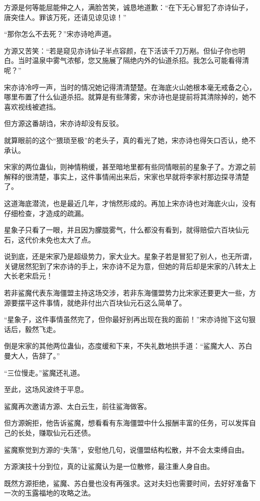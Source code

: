 \begin{this_body}
方源是何等能屈能伸之人，满脸苦笑，诚恳地道歉：“在下无心冒犯了亦诗仙子，唐突佳人。罪该万死，还请见谅见谅！”

“那你怎么不去死？”宋亦诗呛声道。

方源又苦笑：“若是窥见亦诗仙子半点容颜，在下活该千刀万剐。但仙子你也明白。当时温泉中雾气浓郁，您又施展了隔绝内外的仙道杀招。我怎么可能看得清呢？”

宋亦诗冷哼一声，当时的情况她记得清清楚楚。在海底火山她根本毫无戒备之心，哪里布置了什么仙道杀招。就算是有些薄雾，宋亦诗也是提前将其清除掉的，她不喜欢视线被遮挡。

但方源这番胡诌，宋亦诗却没有反驳。

就算眼前的这个“猥琐至极”的老头子，真的看光了她，宋亦诗也得矢口否认，绝不承认。

宋家的两位蛊仙，则神情稍缓，甚至暗地里都有些同情眼前的星象子了。方源之前解释的很清楚，事实上，这件事情闹出来后，宋家也早就将李家村那边探寻清楚了。

这道海底潜流，也是最近几年，才悄然形成的。再加上宋亦诗也对海底火山，没有仔细检查，才造成的疏漏。

星象子只看了一眼，并且因为朦胧雾气，什么都没有看到，就得赔偿六百块仙元石，这代价未免也太大了点。

说到底，还是宋家乃是超级势力，家大业大。星象子若是冒犯了别人，也无所谓，关键居然犯到了宋亦诗的手上，宋亦诗不足为意，但她的背后却是宋家的八转太上大长老宋启元！

若非鲨魔代表东海僵盟主持这场交涉，若非东海僵盟势力比宋家还要更大一些，方源要摆平这件事情，就绝非付出六百块仙元石这么简单了。

“星象子，这件事情虽然完了，但你最好别再出现在我的面前！”宋亦诗抛下这句狠话后，毅然飞走。

倒是宋家的其他两位蛊仙，态度缓和下来，不失礼数地拱手道：“鲨魔大人、苏白曼大人，告辞了。”

“三位慢走。”鲨魔还礼道。

至此，这场风波终于平息。

鲨魔再次邀请方源、太白云生，前往鲨海做客。

但方源婉拒，他告诉鲨魔，想看看有东海僵盟中什么报酬丰富的任务，可以发挥自己的长处，赚取仙元石还债。

鲨魔察觉到方源的“失落”，安慰他几句，说僵盟结构松散，并不会太束缚自由。

方源演技十分到位，真的让鲨魔认为是一位散修，最注重人身自由。

既然方源拒绝，鲨魔、苏白曼也没有再强求。这对夫妇也需要时间，去好好准备下一次的玉露福地的攻略之法。


\end{this_body}
